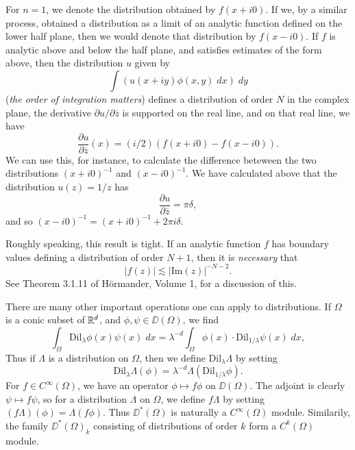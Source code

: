 \begin{example}
    For $n = 1$, we denote the distribution obtained by $f(x + i 0)$. If we, by a similar process, obtained a distribution as a limit of an analytic function defined on the lower half plane, then we would denote that distribution by $f(x - i0)$. If $f$ is analytic above and below the half plane, and satisfies estimates of the form above, then the distribution $u$ given by
    \[ \int \left( u(x + i y) \phi(x,y)\; dx \right)\; dy \]
    (\emph{the order of integration matters}) defines a distribution of order $N$ in the complex plane, the derivative $\partial u / \partial \overline{z}$ is supported on the real line, and on that real line, we have
    \[ \frac{\partial u}{\partial \overline{z}}(x) = (i/2) \left( f(x + i0) - f(x - i0) \right). \]
    We can use this, for instance, to calculate the difference beteween the two distributions $(x + i0)^{-1}$ and $(x - i0)^{-1}$. We have calculated above that the distribution $u(z) = 1/z$ has
    \[ \frac{\partial u}{\partial \overline{z}} = \pi \delta, \]
    and so $(x - i0)^{-1} = (x + i0)^{-1} + 2 \pi i \delta$.
\end{example}

\begin{remark}
    Roughly speaking, this result is tight. If an analytic function $f$ has boundary values defining a distribution of order $N+1$, then it is \emph{necessary} that
    \[ |f(z)| \lesssim |\text{Im}(z)|^{-N-2}. \]
    See Theorem 3.1.11 of H\"{o}rmander, Volume 1, for a discussion of this.
\end{remark}

There are many other important operations one can apply to distributions. If $\Omega$ is a conic subset of $\operatorname{\mathbb{R}}^d$, and $\phi,\psi \in \DD(\Omega)$, we find
%
\[ \int_{\Omega} \text{Dil}_\lambda \phi(x) \psi(x)\; dx = \lambda^{-d} \int_{\Omega} \phi(x) \cdot \text{Dil}_{1/\lambda} \psi(x)\; dx, \]
%
Thus if $\Lambda$ is a distribution on $\Omega$, then we define $\text{Dil}_\lambda \Lambda$ by setting
%
\[ \text{Dil}_\lambda \Lambda (\phi) = \lambda^{-d} \Lambda( \text{Dil}_{1/\lambda} \phi). \]
%
For $f \in C^\infty(\Omega)$, we have an operator $\phi \mapsto f \phi$ on $\DD(\Omega)$. The adjoint is clearly $\psi \mapsto f \psi$, so for a distribution $\Lambda$ on $\Omega$, we define $f \Lambda$ by setting $(f\Lambda)(\phi) = \Lambda(f \phi)$. Thus $\DD^*(\Omega)$ is naturally a $C^\infty(\Omega)$ module. Similarily, the family $\DD^*(\Omega)_k$ consisting of distributions of order $k$ form a $C^k(\Omega)$ module.

